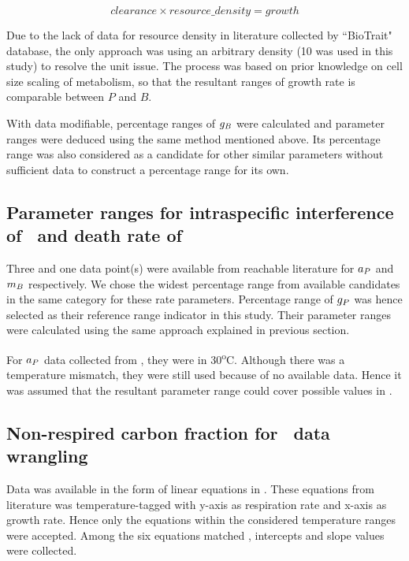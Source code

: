 \documentclass[../thesis.tex]{subfiles} %
\begin{document}
\begin{equation}
    clearance \times resource\_density = growth
    \label{eq:gB}
\end{equation}

Due to the lack of data for resource density in literature collected by ``BioTrait" database\autocite{della2013thermal}, the only approach was using an arbitrary density (10 was used in this study) to resolve the unit issue.  The process was based on prior knowledge on cell size scaling of metabolism, so that the resultant ranges of growth rate is comparable between $P$ and $B$.

With data modifiable, percentage ranges of $g_B$ were calculated and parameter ranges were deduced using the same method mentioned above.  Its percentage range was also considered as a candidate for other similar parameters without sufficient data to construct a percentage range for its own.

\subsection{Parameter ranges for intraspecific interference of \phy\ and death rate of \bac}
Three and one data point(s) were available from reachable literature for $a_P$ \autocite{de2007biofixation} and $m_B$ \autocite{cochran1988estimation} respectively.  We chose the widest percentage range from available candidates in the same category for these rate parameters.  Percentage range of $g_P$ was hence selected as their reference range indicator in this study.  Their parameter ranges were calculated using the same approach explained in previous section.

For $a_P$ data collected from \autocite{de2007biofixation}, they were in 30\textsuperscript{o}C.  Although there was a temperature mismatch, they were still used because of no available data.  Hence it was assumed that the resultant parameter range could cover possible values in \temp.

\subsection{Non-respired carbon fraction for \phy\ data wrangling}
Data was available in the form of linear equations in \autocite{j1989respiration}.  These equations from literature was temperature-tagged with y-axis as respiration rate and x-axis as growth rate.  Hence only the equations within the considered temperature ranges were accepted.  Among the six equations matched , intercepts and slope values were collected.
\end{document}
